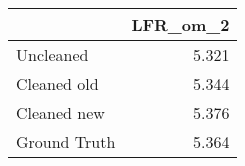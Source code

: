 \begin{tabular}{lr}
\toprule
{} & LFR_om_2 \\
\midrule
Uncleaned    &    5.321 \\
Cleaned old  &    5.344 \\
Cleaned new  &    5.376 \\
Ground Truth &    5.364 \\
\bottomrule
\end{tabular}
